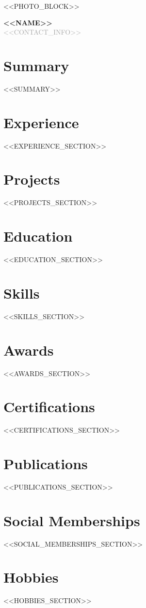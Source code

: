 \documentclass[<<FONT_SIZE>>,a4paper]{article}
\begin{document}
\begin{minipage}[c]{0.15\textwidth}
    <<PHOTO_BLOCK>>
\end{minipage}
\hfill
\begin{minipage}[c]{0.8\textwidth}
    {\Huge \textbf{\color{primary}<<NAME>>}} \\[1ex]
    \textcolor{darkgray}{<<CONTACT_INFO>>}
\end{minipage}

\vspace{5mm}

\section*{Summary}
<<SUMMARY>>

\section*{Experience}
<<EXPERIENCE_SECTION>>

\section*{Projects}
<<PROJECTS_SECTION>>

\section*{Education}
<<EDUCATION_SECTION>>

\section*{Skills}
<<SKILLS_SECTION>>

\section*{Awards}
<<AWARDS_SECTION>>

\section*{Certifications}
<<CERTIFICATIONS_SECTION>>

\section*{Publications}
<<PUBLICATIONS_SECTION>>

\section*{Social Memberships}
<<SOCIAL_MEMBERSHIPS_SECTION>>

\section*{Hobbies}
<<HOBBIES_SECTION>>
\end{document}
